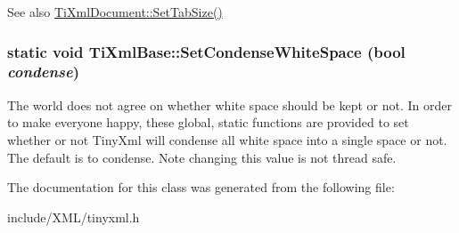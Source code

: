 \begin{DoxySeeAlso}{See also}
\hyperlink{class_ti_xml_document_a51dac56316f89b35bdb7d0d433ba988e}{TiXmlDocument::SetTabSize()} 
\end{DoxySeeAlso}
\hypertarget{class_ti_xml_base_a0f799ec645bfb8d8a969e83478f379c1}{
\subsubsection[{SetCondenseWhiteSpace}]{\setlength{\rightskip}{0pt plus 5cm}static void TiXmlBase::SetCondenseWhiteSpace (bool {\em condense})}}
\label{class_ti_xml_base_a0f799ec645bfb8d8a969e83478f379c1}
The world does not agree on whether white space should be kept or not. In order to make everyone happy, these global, static functions are provided to set whether or not TinyXml will condense all white space into a single space or not. The default is to condense. Note changing this value is not thread safe. 

The documentation for this class was generated from the following file:\begin{DoxyCompactItemize}
\item 
include/XML/tinyxml.h\end{DoxyCompactItemize}
